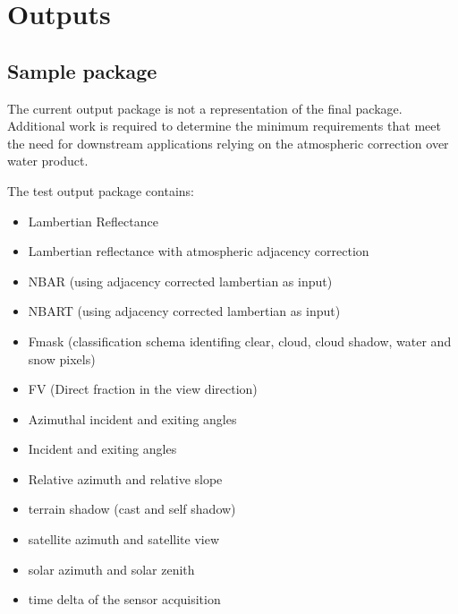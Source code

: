 \documentclass[a4paper]{article}
\begin{document}
  \section{Outputs}

    \subsection{Sample package}

    \begin{flushleft}
      The current output package is not a representation of the final package. Additional work is required to determine the minimum requirements that meet the need for downstream applications relying on the atmospheric correction over water product. \par
      The test output package contains:
    \end{flushleft}

      \begin{itemize}
        \item \small{Lambertian Reflectance}
        \item \small{Lambertian reflectance with atmospheric adjacency correction}
        \item \small{NBAR (using adjacency corrected lambertian as input)}
        \item \small{NBART (using adjacency corrected lambertian as input)}
        \item \small{Fmask (classification schema identifing clear, cloud, cloud shadow, water and snow pixels)}
        \item \small{FV (Direct fraction in the view direction)}
        \item \small{Azimuthal incident and exiting angles}
        \item \small{Incident and exiting angles}
        \item \small{Relative azimuth and relative slope}
        \item \small{terrain shadow (cast and self shadow)}
        \item \small{satellite azimuth and satellite view}
        \item \small{solar azimuth and solar zenith}
        \item \small{time delta of the sensor acquisition}
      \end{itemize}
\end{document}
